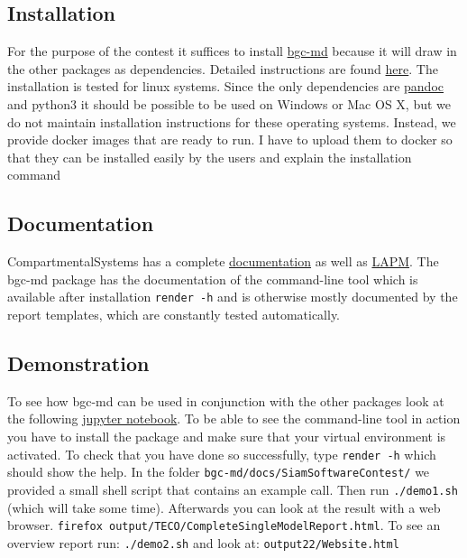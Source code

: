 \documentclass[a4paper]{article}
\begin{document}
\subsection{Installation}
For the purpose of the contest it suffices to install \href{https://github.com/MPIBGC-TEE/bgc-md}{bgc-md} because it will draw in the other packages as dependencies. Detailed instructions are found \href{https://github.com/MPIBGC-TEE/bgc-md#installation}{here}.
The installation is tested for linux systems. Since the only dependencies are \href{https://pandoc.org/installing.html}{pandoc} and python3 it should be possible to be used on Windows or Mac OS X, but we do not maintain installation instructions for these operating systems.
Instead, we provide docker images that are ready to run. {\color{red} I have to upload them to  docker so that they can be installed easily by the users and explain the installation command}


\subsection{Documentation}
CompartmentalSystems has a complete \href{http://compartmentalsystems.readthedocs.io/en/latest/}{documentation}
as well as \href{http://lapm.readthedocs.io/en/latest/}{LAPM}. The bgc-md package has the documentation of the command-line tool which is available after installation \texttt{render -h} 
and is otherwise mostly documented by the report templates, which are constantly tested automatically.

\subsection{Demonstration}
To see how bgc-md can be used in conjunction with the other packages look at the following \href{https://github.com/MPIBGC-TEE/bgc-md/blob/master/jupyter_notebooks/Examples/how_to_apply_toolkit_to_yaml_model.ipynb}{jupyter notebook}.
To be able to see the command-line tool in action you have to install the package and make sure that your virtual environment is activated. 
To check that you have done so successfully, type \texttt{render -h} which should show the help.
In the folder \texttt{bgc-md/docs/SiamSoftwareContest/} we provided a small shell script that contains an example call. 
Then run \texttt{./demo1.sh} (which will take some time).
Afterwards you can look at the result with a web browser.
\texttt{firefox output/TECO/CompleteSingleModelReport.html}.
To see an overview report run: \texttt{./demo2.sh} and look at: \texttt{output22/Website.html}
\end{document}
